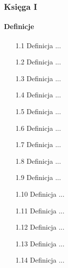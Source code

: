 \subsubsection{Księga I}	
\paragraph{Definicje}	
\begin{enumerate}	
    \item [1.1] Definicja ... %
    \item [1.2] Definicja ... %
    \item [1.3] Definicja ... %
    \item [1.4] Definicja ... %
    \item [1.5] Definicja ... %
    \item [1.6] Definicja ... %
    \item [1.7] Definicja ... %
    \item [1.8] Definicja ... %
    \item [1.9] Definicja ... %
    \item [1.10] Definicja ... %
    \item [1.11] Definicja ... %
    \item [1.12] Definicja ... %
    \item [1.13] Definicja ... %
    \item [1.14] Definicja ... %

\end{enumerate}

